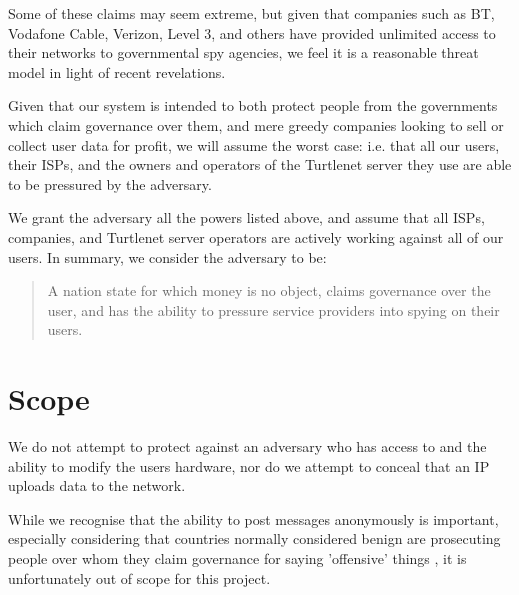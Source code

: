 Some of these claims may seem extreme, but given that companies such as BT,
Vodafone Cable, Verizon, Level 3, and others have provided unlimited access to
their networks\cite{tempora} to governmental spy agencies, we feel it is a
reasonable threat model in light of recent revelations\cite{wikiDisclosures}.

Given that our system is intended to both protect people from the governments
which claim governance over them, and mere greedy companies looking to sell or
collect user data for profit, we will assume the worst case: i.e. that all
our users, their ISPs, and the owners and operators of the Turtlenet server they
use are able to be pressured by the adversary.

We grant the adversary all the powers listed above, and assume that
all ISPs, companies, and Turtlenet server operators are actively working against
all of our users. In summary, we consider the adversary to be:

\begin{quote}
\centering
A nation state for which money is no object, claims governance over the user,
and has the ability to pressure service providers into spying on their users.
\end{quote}

\section{Scope}
We do not attempt to protect against an adversary who has access to and the
ability to modify the users hardware, nor do we attempt to conceal that an IP
uploads data to the network.

While we recognise that the ability to post messages anonymously is important,
especially considering that countries normally considered benign are prosecuting
people over whom they claim governance for saying 'offensive' things
\cite{illegalOpinions}, it is unfortunately out of scope for this project.
